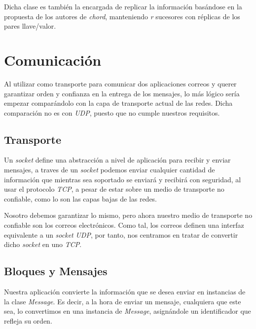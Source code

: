 \documentclass[a4paper]{article}
\begin{document}
	Dicha clase es también la encargada de replicar la información basándose en la propuesta de los autores de \emph{chord}, manteniendo \emph{r} sucesores con réplicas de los pares llave/valor.

\section{Comunicación}
Al utilizar como transporte para comunicar dos aplicaciones correos y querer garantizar orden y confianza en la entrega de los mensajes, lo más lógico sería empezar comparándolo con la capa de transporte actual de las redes. Dicha comparación no es con \emph{UDP}, puesto que no cumple nuestros requisitos.

	\subsection{Transporte}
	Un \emph{socket} define una abstracción a nivel de aplicación para recibir y enviar mensajes, a traves de un \emph{socket} podemos enviar cualquier cantidad de información que mientras sea soportado se enviará y recibirá con seguridad, al usar el protocolo \emph{TCP}, a pesar de estar sobre un medio de transporte no confiable, como lo son las capas bajas de las redes.
	
	Nosotro debemos garantizar lo mismo, pero ahora nuestro medio de transporte no confiable son los correos electrónicos. Como tal, los correos definen una interfaz equivalente a un \emph{socket} \emph{UDP}, por tanto, nos centramos en tratar de convertir dicho \emph{socket} en uno \emph{TCP}.
	
	\subsection{Bloques y Mensajes}
	Nuestra aplicación convierte la información que se desea enviar en instancias de la clase \emph{Message}.
	Es decir, a la hora de enviar un mensaje, cualquiera que este sea, lo convertimos en una instancia de \emph{Message}, asignándole un identificador que refleja su orden. 
\end{document}

